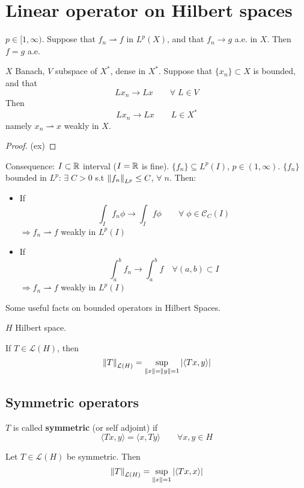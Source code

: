 \newpage
\section{Linear operator on Hilbert spaces}
\begin{proposition}
    \(p \in [1, \infty)\). Suppose that \(f_n \rightharpoonup f\) in \(L^p(X)\), and that \(f_n \to g\) a.e. in \(X\). Then \(f=g\) a.e.
\end{proposition}

\begin{proposition}
    \(X\) Banach, \(V\) subspace of \(X^*\), dense in \(X^*\). Suppose that \(\{x_n\} \subset X\) is bounded, and that 
    \[
        L x_n \to Lx \qquad \forall\; L \in V
    \]
    Then
    \[
        L x_n \to Lx \qquad L \in X^*
    \]
    namely \(x_n \rightharpoonup x\) weakly in \(X\).
\end{proposition}
\begin{proof}
    (ex)
\end{proof}

Consequence: \(I \subset \mathbb{R}\) interval (\(I= \mathbb{R}\) is fine). \(\{f_n\} \subseteq L^p(I)\), \(p \in (1, \infty)\). 
\(\{f_n\}\) bounded in \(L^p\): \(\exists \; C>  0\) s.t \(\norm{f_n}_{L^p} \leq C\), \(\forall \; n\). Then:

\begin{itemize}
    \item If 
    \[
        \int_I f_n \phi \to \int_I f \phi \qquad \forall \; \phi \in \mathcal{C}_C(I)
    \]
    \(\Rightarrow f_n \rightharpoonup f\) weakly in \(L^p(I)\)
    \item If 
    \[
        \int_a^b f_n \to \int_a^b f \quad \forall (a, b) \subset I
    \]
    \(\Rightarrow f_n \rightharpoonup f\) weakly in \(L^p(I)\)
\end{itemize}

Some useful facts on bounded operators in Hilbert Spaces.

\(H\) Hilbert space. 
\begin{proposition}
    If \(T \in \mathcal{L}(H)\), then
    \[
        \norm{T}_{\mathcal{L}(H)} = \sup_{\norm{x}=\norm{y}=1} \abs{\langle Tx, y\rangle  }
    \]
\end{proposition}
\subsection{Symmetric operators}
\begin{definition}
    \(T \) is called \textbf{symmetric} (or self adjoint) if 
    \[
        \langle Tx, y\rangle   = \langle x, Ty\rangle   \qquad \forall x, y \in H
    \]
\end{definition}
\begin{proposition}
    Let \(T \in \mathcal{L}(H)\) be symmetric. Then 
    \[
        \norm{T}_{\mathcal{L}(H)} = \sup_{\norm{x}= 1} \abs{\langle Tx, x\rangle  }
    \]
\end{proposition}

